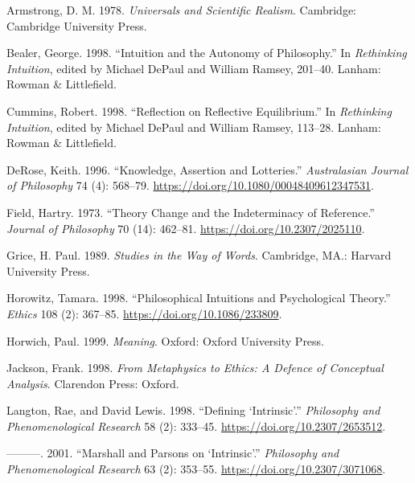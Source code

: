 \documentclass[
  11pt,
  letterpaper,
  DIV=11,
  numbers=noendperiod,
  oneside]{scrartcl}
\newlength{\cslhangindent}
\newenvironment{CSLReferences}[2] %
 {\begin{list}{}{%
  \setlength{\itemindent}{0pt}
  \setlength{\leftmargin}{0pt}
  \setlength{\parsep}{0pt}
  \ifodd #1
   \setlength{\leftmargin}{\cslhangindent}
   \setlength{\itemindent}{-1\cslhangindent}
  \fi
  \setlength{\itemsep}{#2\baselineskip}}}
 {\end{list}}
\begin{document}
\label{refs}
\begin{CSLReferences}{1}{0}
Armstrong, D. M. 1978. \emph{Universals and Scientific Realism}.
Cambridge: Cambridge University Press.

Bealer, George. 1998. {``Intuition and the Autonomy of Philosophy.''} In
\emph{Rethinking Intuition}, edited by Michael DePaul and William
Ramsey, 201--40. Lanham: Rowman \& Littlefield.

Cummins, Robert. 1998. {``Reflection on Reflective Equilibrium.''} In
\emph{Rethinking Intuition}, edited by Michael DePaul and William
Ramsey, 113--28. Lanham: Rowman \& Littlefield.

DeRose, Keith. 1996. {``Knowledge, Assertion and Lotteries.''}
\emph{Australasian Journal of Philosophy} 74 (4): 568--79.
\url{https://doi.org/10.1080/00048409612347531}.

Field, Hartry. 1973. {``Theory Change and the Indeterminacy of
Reference.''} \emph{Journal of Philosophy} 70 (14): 462--81.
\url{https://doi.org/10.2307/2025110}.

Grice, H. Paul. 1989. \emph{Studies in the Way of Words}. Cambridge,
MA.: Harvard University Press.

Horowitz, Tamara. 1998. {``Philosophical Intuitions and Psychological
Theory.''} \emph{Ethics} 108 (2): 367--85.
\url{https://doi.org/10.1086/233809}.

Horwich, Paul. 1999. \emph{Meaning}. Oxford: Oxford University Press.

Jackson, Frank. 1998. \emph{From Metaphysics to Ethics: A Defence of
Conceptual Analysis}. Clarendon Press: Oxford.

Langton, Rae, and David Lewis. 1998. {``Defining {`Intrinsic'}.''}
\emph{Philosophy and Phenomenological Research} 58 (2): 333--45.
\url{https://doi.org/10.2307/2653512}.

---------. 2001. {``Marshall and {P}arsons on {`Intrinsic'}.''}
\emph{Philosophy and Phenomenological Research} 63 (2): 353--55.
\url{https://doi.org/10.2307/3071068}.


\end{CSLReferences}
\end{document}

